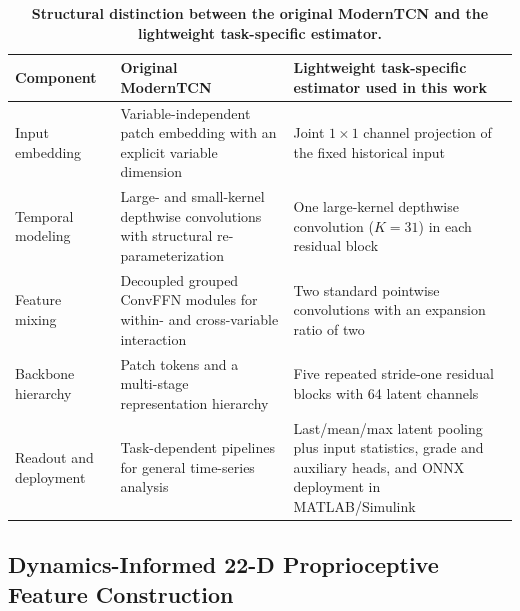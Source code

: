 \documentclass{ieeeaccess}
\newcommand{\citep}[1]{\cite{#1}}
\begin{document}
\begin{table}[!t]
\centering
\caption{\textbf{Structural distinction between the original ModernTCN and the lightweight task-specific estimator.}}
\label{tab:moderntcn_variant_comparison}
\setlength{\tabcolsep}{3pt}
\begin{tabular}{|p{}|p{}|p{}|}
\hline
Component & Original ModernTCN~\citep{Luo2024ModernTCN} & Lightweight task-specific estimator used in this work \\
\hline
Input embedding & Variable-independent patch embedding with an explicit variable dimension & Joint $1\times1$ channel projection of the fixed historical input \\
Temporal modeling & Large- and small-kernel depthwise convolutions with structural re-parameterization & One large-kernel depthwise convolution ($K=31$) in each residual block \\
Feature mixing & Decoupled grouped ConvFFN modules for within- and cross-variable interaction & Two standard pointwise convolutions with an expansion ratio of two \\
Backbone hierarchy & Patch tokens and a multi-stage representation hierarchy & Five repeated stride-one residual blocks with 64 latent channels \\
Readout and deployment & Task-dependent pipelines for general time-series analysis & Last/mean/max latent pooling plus input statistics, grade and auxiliary heads, and ONNX deployment in MATLAB/Simulink \\
\hline
\end{tabular}
\end{table}

\subsection{Dynamics-Informed 22-D Proprioceptive Feature Construction}
\end{document}
